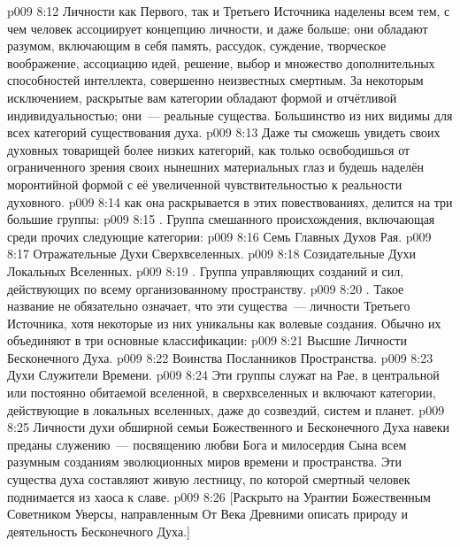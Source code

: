 \vs p009 8:12 Личности как Первого, так и Третьего Источника наделены всем тем, с чем человек ассоциирует концепцию личности, и даже больше; они обладают разумом, включающим в себя память, рассудок, суждение, творческое воображение, ассоциацию идей, решение, выбор и множество дополнительных способностей интеллекта, совершенно неизвестных смертным. За некоторым исключением, раскрытые вам категории обладают формой и отчётливой индивидуальностью; они~--- реальные существа. Большинство из них видимы для всех категорий существования духа.
\vs p009 8:13 Даже ты сможешь увидеть своих духовных товарищей более низких категорий, как только освободишься от ограниченного зрения своих нынешних материальных глаз и будешь наделён моронтийной формой с её увеличенной чувствительностью к реальности духовного.
\vs p009 8:14 \pc {} как она раскрывается в этих повествованиях, делится на три большие группы:
\vs p009 8:15 . Группа смешанного происхождения, включающая среди прочих следующие категории:
\vs p009 8:16 Семь Главных Духов Рая.
\vs p009 8:17 Отражательные Духи Сверхвселенных.
\vs p009 8:18 Созидательные Духи Локальных Вселенных.
\vs p009 8:19 . Группа управляющих созданий и сил, действующих по всему организованному пространству.
\vs p009 8:20 . Такое название не обязательно означает, что эти существа~--- личности Третьего Источника, хотя некоторые из них уникальны как волевые создания. Обычно их объединяют в три основные классификации:
\vs p009 8:21 Высшие Личности Бесконечного Духа.
\vs p009 8:22 Воинства Посланников Пространства.
\vs p009 8:23 Духи Служители Времени.
\vs p009 8:24 Эти группы служат на Рае, в центральной или постоянно обитаемой вселенной, в сверхвселенных и включают категории, действующие в локальных вселенных, даже до созвездий, систем и планет.
\vs p009 8:25 Личности духи обширной семьи Божественного и Бесконечного Духа навеки преданы служению~--- посвящению любви Бога и милосердия Сына всем разумным созданиям эволюционных миров времени и пространства. Эти существа духа составляют живую лестницу, по которой смертный человек поднимается из хаоса к славе.
\vsetoff
\vs p009 8:26 [Раскрыто на Урантии Божественным Советником Уверсы, направленным От Века Древними описать природу и деятельность Бесконечного Духа.]
\quizlink
